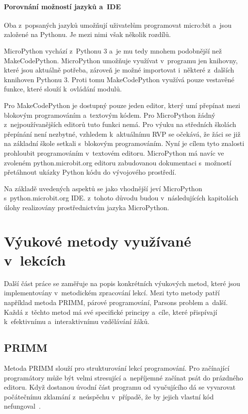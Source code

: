 \documentclass[
  digital,     %
  oneside,     %
  nosansbold,  %
  colorbold, %
  lof,         %
  nolot,         %
]{fithesis4}
\begin{document}
\subsubsection{Porovnání možností jazyků a~IDE} 
Oba z~popsaných jazyků umožňují uživatelům programovat micro:bit a~jsou založené na Pythonu. Je mezi nimi však několik rozdílů.

MicroPython vychází z~Pythonu 3 a~je mu tedy mnohem podobnější než MakeCodePython. MicroPython umožňuje využívat v~programu jen knihovny, které jsou aktuálně potřeba, zároveň je možné importovat i~některé z~dalších knnihoven Pythonu 3. Proti tomu MakeCodePython využívá pouze vestavěné funkce, které slouží k~ovládání modulů.

Pro MakeCodePython je dostupný pouze jeden editor, který umí přepínat mezi blokovým programováním a~textovým kódem. Pro MicroPython žádný z~nejpoužívanějších editorů tuto funkci nemá. Pro výuku na středních školách  přepínání není nezbytné, vzhledem k~aktuálnímu RVP se očekává, že žáci se již na základní škole setkali s~blokovým programováním. Nyní je cílem tyto znalosti prohloubit programováním v~textovém editoru.  MicroPython má navíc ve zvoleném python.microbit.org editoru zabudovanou dokumentaci s~možností přetáhnout ukázky Python kódu do vývojového prostředí.

Na základě uvedených aspektů se jako vhodnější jeví MicroPython s~python.microbit.org IDE. z~tohoto důvodu budou v~následujících kapitolách úlohy realizovány prostřednictvím jazyka MicroPython. 

\chapter{Výukové metody využívané v~lekcích}
Další část práce se zaměřuje na popis konkrétních výukových metod, které jsou implementovány v~metodickém zpracování lekcí. Mezi tyto metody patří například metoda PRIMM, párové programování, Parsons problem a~další. Každá z~těchto metod má své specifické principy a~cíle, které přispívají k~efektivnímu a~interaktivnímu vzdělávání žáků.

\section{PRIMM}
Metoda PRIMM slouží pro strukturování lekcí programování. Pro začínající programátory může být velmi stresující a~nepříjemné začínat psát do prázdného editoru. Když dostanou úvodní část programu od vyučujícího dá se vyvarovat počátečnímu zklamání z~neúspěchu v~případě, že by jejich vlastní kód nefungoval~\cite{hw}.
\end{document}

